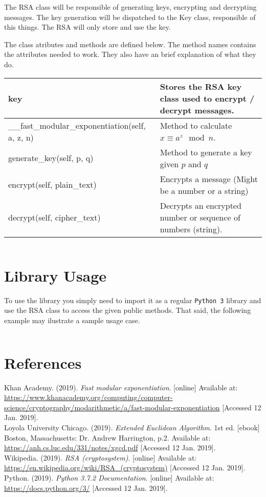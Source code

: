 \documentclass[usenames,dvipsnames,12pt]{report}
\begin{document}
The RSA class will be responsible of generating keys, encrypting and decrypting messages.
The key generation will be dispatched to the Key class, responsible of this things. The
RSA will only store and use the key.

The class atributes and methods are defined below. The method names contains the attributes needed to work.
They also have an brief explanation of what they do.

\begin{center}
    \begin{tabular}{ | l | p{6cm} |}
    \hline
    key & Stores the RSA key class used to encrypt / decrypt messages.\\ \hline
    \_\_fast\_modular\_exponentiation(self, a, z, n) & Method to calculate $x \equiv a^z \mod n$.\\ \hline
    generate\_key(self, p, q) & Method to generate a key given $p$ and $q$\\ \hline
    encrypt(self, plain\_text) & Encrypts a message (Might be a number or a string)\\ \hline
    decrypt(self, cipher\_text) & Decrypts an encrypted number or sequence of numbers (string).\\
    \hline
    \end{tabular}
\end{center}

\inputminted[linenos, breaklines=true]{python}{../Python/RSA/RSA.py}

\chapter{Library Usage}

To use the library you simply need to import it as a regular \texttt{Python 3} library and use the RSA class
to access the given public methods. That said, the following example may ilustrate a sample usage case.

\inputminted[linenos, breaklines=true]{python}{../Python/main.py}

\chapter{References}

Khan Academy. (2019). \textit{Fast modular exponentiation}.
[online] Available at:
\url{https://www.khanacademy.org/computing/computer-science/cryptography/modarithmetic/a/fast-modular-exponentiation}
[Accessed 12 Jan. 2019].\\

Loyola University Chicago. (2019). \textit{Extended Euclidean Algorithm}. 1st ed.
[ebook] Boston, Massachusetts: Dr. Andrew Harrington, p.2. Available at:
\url{https://anh.cs.luc.edu/331/notes/xgcd.pdf}
[Accessed 12 Jan. 2019].\\

Wikipedia. (2019). \textit{RSA (cryptosystem)}.
[online] Available at:
\url{https://en.wikipedia.org/wiki/RSA_(cryptosystem)}
[Accessed 12 Jan. 2019].\\

Python. (2019). \textit{Python 3.7.2 Documentation}.
[online] Available at:
\url{https://docs.python.org/3/}
[Accessed 12 Jan. 2019].
\end{document}
